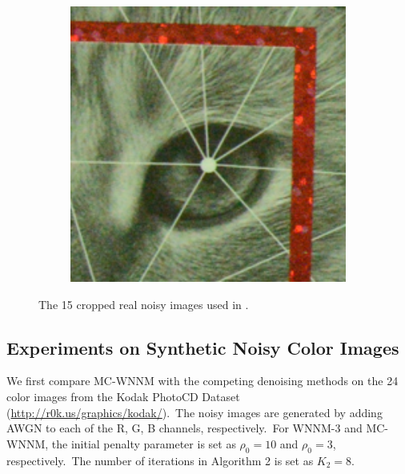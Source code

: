 \begin{figure}
\begin{subfigure}[t]{0.19\textwidth}
    \end{subfigure}
    \hfill
    \begin{subfigure}[t]{0.19\textwidth}
        \centering
        \includegraphics[width=1\textwidth]{images/mcwnnm/resize_d800_iso6400_3_real.png}
    \end{subfigure}
    \caption{The 15 cropped real noisy images used in \cite{crosschannel2016}.}
    \label{fig4-2}
\end{figure}


\subsection{Experiments on Synthetic Noisy Color Images}

We first compare MC-WNNM with the competing denoising methods \cite{cbm3d,mlp,chen2015learning,dncnn,noiseclinic,neatimage} on the 24 color images from the Kodak PhotoCD Dataset (\url{http://r0k.us/graphics/kodak/}).\ The noisy images are generated by adding AWGN to each of the R, G, B channels, respectively.\ For WNNM-3 and MC-WNNM, the initial penalty parameter is set as $\rho_{0}=10$ and $\rho_{0}=3$, respectively.\ The number of iterations in Algorithm 2 is set as $K_{2}=8$. 

